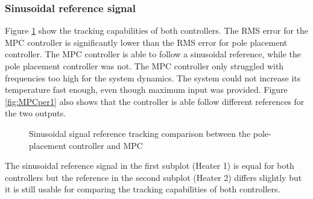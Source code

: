 \subsubsection{Sinusoidal reference signal}
Figure \ref{fig:compSinC} show the tracking capabilities of both controllers. The RMS error for the MPC controller is significantly lower than the RMS error for pole placement controller. The MPC controller is able to follow a sinusoidal reference, while the pole placement controller was not. The MPC controller only struggled with frequencies too high for the system dynamics. The system could not increase its temperature fast enough, even though maximum input was provided. Figure \ref{fig:MPCper1} also shows that the controller is able follow different references for the two outputs.

\begin{figure}
    \centering
    
    \caption{Sinusoidal signal reference tracking comparison between the pole-placement controller and MPC}
    \label{fig:compSinC}
\end{figure}

The sinusoidal reference signal in the first subplot (Heater 1) is equal for both controllers but the reference in the second subplot (Heater 2) differs slightly but it is still usable for comparing the tracking capabilities of both controllers.  


